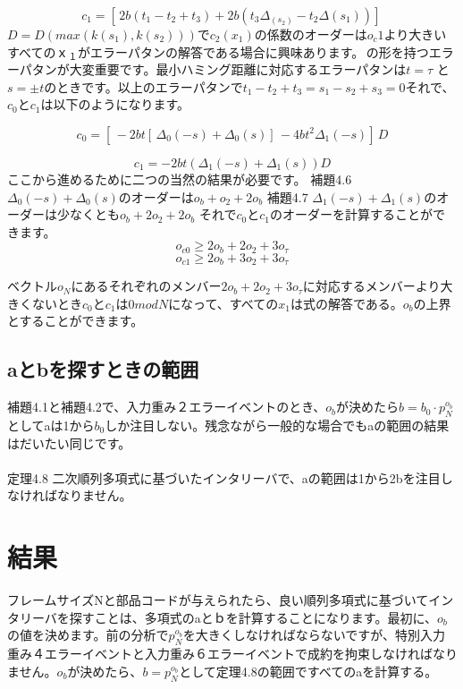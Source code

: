 \documentclass[20 pts]{article}
\begin{document}
\begin{equation}\tag{31}
c_1=[\, 2b(t_1-t_2+t_3)+2b(t_3\Delta_(s_2)-t_2\Delta(s_1))]\,
\end{equation}
$D=D(max⁡(k(s_1) ,k(s_2)))$で$c_2 (x_1)$の係数のオーダーは$o_c1$より大きいすべての$ｘ_１$がエラーパタンの解答である場合に興味あります。\newline
[\,2t,t,-t,s,-s,2s]\,の形を持つエラーパタンが大変重要です。最小ハミング距離に対応するエラーパタンは$t=\tau$ と
$s=\pm t$のときです。以上のエラーパタンで$t_1-t_2+t_3=s_1-s_2+s_3=0$それで、$c_0$と$c_1$は以下のようになります。

\begin{equation}\tag{32}
c_0=\left[\,-2bt[\,\Delta_0(-s)+\Delta_0(s)]\,-4bt^2\Delta_1(-s)\right]\,D
\end{equation}

\begin{equation}\tag{33}
c_1=-2bt(\Delta_1(-s)+\Delta_1(s))D
\end{equation}
ここから進めるために二つの当然の結果が必要です。
補題4.6
$\Delta_0 (-s)+\Delta_0 (s)$のオーダーは$o_b +o_2+2o_b$
補題4.7
$\Delta_1 (-s)+\Delta_1 (s)$のオーダーは少なくとも$o_b +2o_2+2o_b$
それで$c_0$と$c_1$のオーダーを計算することができます。
$$o_{c0}\geq2o_b+2o_2+3o_\tau$$
$$o_{c1}\geq2o_b+3o_2+3o_\tau$$

ベクトル$o_N$にあるそれぞれのメンバー$2o_b+2o_2+3o_\tau$に対応するメンバーより大きくないとき$c_0$と$c_1$は$0modN$になって、すべての$x_1$は式の解答である。$o_b$の上界とすることができます。

\subsection{aとbを探すときの範囲}
補題4.1と補題4.2で、入力重み２エラーイベントのとき、$o_b$が決めたら$b=b_0 \cdot p_N^{o_b}$としてaは1から$b_0$しか注目しない。残念ながら一般的な場合でもaの範囲の結果はだいたい同じです。
\paragraph{}
定理4.8
二次順列多項式に基づいたインタリーバで、aの範囲は1から2bを注目しなければなりません。

\section{結果}
フレームサイズNと部品コードが与えられたら、良い順列多項式に基づいてインタリーバを探すことは、多項式のaとｂを計算することになります。最初に、$o_b$の値を決めます。前の分析で$p_N^{o_b}$を大きくしなければならないですが、特別入力重み４エラーイベントと入力重み６エラーイベントで成約を拘束しなければなりません。$o_b$が決めたら、$b=p_N^{o_b}$として定理4.8の範囲ですべてのaを計算する。
\end{document}
